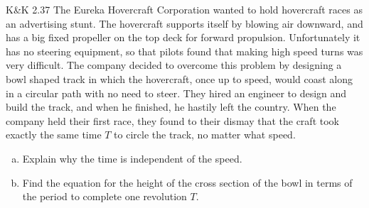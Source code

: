 \documentclass{esg8012pset}
\begin{document}
\begin{problem}{K\&K 2.37}
  The Eureka Hovercraft Corporation wanted to hold hovercraft races as an advertising stunt. The hovercraft supports itself by blowing air downward, and has a big fixed propeller on the top deck for forward propulsion. Unfortunately it has no steering equipment, so that pilots found that making high speed turns was very difficult. The company decided to overcome this problem by designing a bowl shaped track in which the hovercraft, once up to speed, would coast along in a circular path with no need to steer. They hired an engineer to design and build the track, and when he finished, he hastily left the country. When the company held their first race, they found to their dismay that the craft took exactly the same time $T$ to circle the track, no matter what speed.
  \begin{enumerate}[a)]
    \item Explain why the time is independent of the speed.
    \item Find the equation for the height of the cross section of the bowl in terms of the period to complete one revolution $T$.
  \end{enumerate}
\end{problem}
\end{document}
